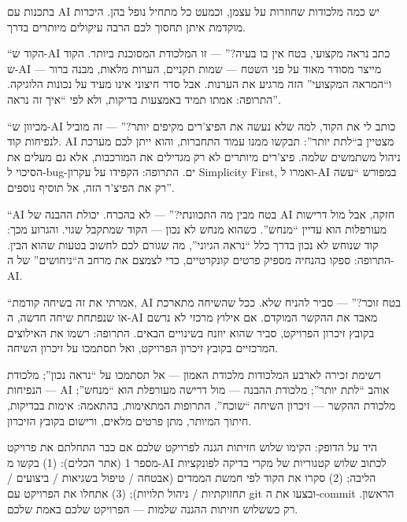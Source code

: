
בתכנות עם AI יש כמה מלכודות שחוזרות על עצמן, וכמעט כל מתחיל נופל בהן. היכרות מוקדמת איתן תחסוך לכם הרבה עיקולים מיותרים בדרך.


“הקוד ש-AI כתב נראה מקצועי, בטח אין בו בעיה?” — זו המלכודת המסוכנת ביותר. הקוד ש-AI מייצר מסודר מאוד על פני השטח — שמות תקניים, הערות מלאות, מבנה ברור — ו“המראה המקצועי” הזה מרגיע את הערנות. אבל סדר חיצוני אינו מעיד על נכונות הלוגיקה. התרופה: אמתו תמיד באמצעות בדיקות, ולא לפי “איך זה נראה”.


“מכיוון ש-AI כותב לי את הקוד, למה שלא נעשה את הפיצ'רים מקיפים יותר?” — זה מוביל לנפיחות קוד. AI מצטיין ב“לתת יותר”: תבקשו ממנו עמוד התחברות, והוא ייתן לכם מערכת ניהול משתמשים שלמה. פיצ'רים מיותרים לא רק מגדילים את המורכבות, אלא גם מעלים את הסיכוי ל-bug-ים. התרופה: הקפידו על עקרון Simplicity First, ואמרו ל-AI במפורש “עשה רק את הפיצ'ר הזה, אל תוסיף נוספים”.


“AI בטח מבין מה התכוונתי?” — לא בהכרח. יכולת ההבנה של AI חזקה, אבל מול דרישות מעורפלות הוא עדיין “מנחש”. כשהוא מנחש לא נכון — הקוד שמתקבל שגוי. והגרוע מכך: קוד שנוחש לא נכון בדרך כלל “נראה הגיוני”, מה שגורם לכם לחשוב בטעות שהוא הבין. התרופה: ספקו בהנחיה מספיק פרטים קונקרטיים, כדי לצמצם את מרחב ה“ניחושים” של ה-AI.


“אמרתי את זה בשיחה קודמת, AI בטח זוכר?” — סביר להניח שלא. ככל שהשיחה מתארכת או שנפתחת שיחה חדשה, ה-AI מאבד את ההקשר המוקדם. אם אילוץ מרכזי לא נרשם בקובץ זיכרון הפרויקט, סביר שהוא יוזנח בשינויים הבאים. התרופה: רשמו את האילוצים המרכזיים בקובץ זיכרון הפרויקט, ואל תסתמכו על זיכרון השיחה.

\begin{tcbwarn}{רשימת זכירה לארבע המלכודות}
מלכודת האמון — אל תסתמכו על “נראה נכון”; מלכודת הנפיחות — AI אוהב “לתת יותר”; מלכודת ההבנה — מול דרישה מעורפלת הוא “מנחש”; מלכודת ההקשר — זיכרון השיחה “שוכח”. התרופות המתאימות, בהתאמה: אימות בבדיקות, חיתוך המיותר, מתן פרטים מלאים, ורישום בקובץ הזיכרון.

\end{tcbwarn}

\begin{tcbpractice}{היד על הדופק: הקימו שלוש חזיתות הגנה לפרויקט שלכם}
אם כבר התחלתם את פרויקט מספר 1 (אתר הכלים): (1) בקשו מ-AI לכתוב שלוש קטגוריות של מקרי בדיקה לפונקציות הליבה; (2) סקרו את הקוד לפי חמשת הממדים (אבטחה / טיפול בשגיאות / ביצועים / תחזוקתיות / ניהול תלויות); (3) אתחלו את הפרויקט עם git ובצעו את ה-commit הראשון. רק כששלוש חזיתות ההגנה שלמות — הפרויקט שלכם באמת שלכם.

\end{tcbpractice}

